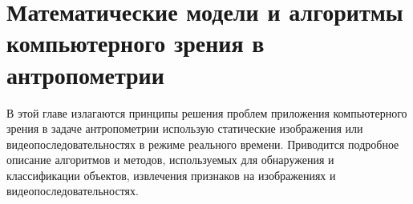\chapter{Математические модели и алгоритмы компьютерного зрения в антропометрии} \label{chapt1}

В этой главе излагаются принципы решения проблем приложения компьютерного зрения в задаче антропометрии использую статические изображения или видеопоследовательностях в режиме реального времени. Приводится подробное описание алгоритмов и методов, используемых для обнаружения и классификации объектов, извлечения признаков на изображениях и видеопоследовательностях.








